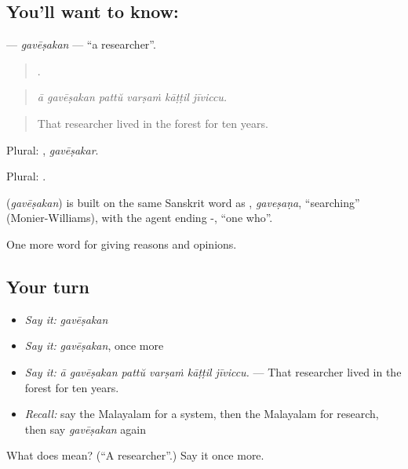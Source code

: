 \subsection*{You'll want to know: }
\textbf{} — \emph{gavēṣakan} — \textquotedblleft{}a researcher\textquotedblright{}.

\begin{quote}
     .
\end{quote}

\begin{quote}
\emph{ā gavēṣakan pattŭ varṣaṁ kāṭṭil jīviccu.}
\end{quote}

\begin{quote}
That researcher lived in the forest for ten years.
\end{quote}

Plural: , \emph{gavēṣakar}.

Plural: .

\begin{cousinweb}
\textbf{} (\emph{gavēṣakan}) is built on the same Sanskrit word as , \emph{gaveṣaṇa}, \textquotedblleft{}searching\textquotedblright{} (Monier-Williams), with the agent ending -, \textquotedblleft{}one who\textquotedblright{}.
\end{cousinweb}

\begin{grammarlens}[title={What you've built}]
One more word for giving reasons and opinions.
\end{grammarlens}

\subsection*{Your turn}
\begin{itemize}
\raggedright
  \item \emph{Say it:} \emph{gavēṣakan}
  \item \emph{Say it:} \emph{gavēṣakan}, once more
  \item \emph{Say it:} \emph{ā gavēṣakan pattŭ varṣaṁ kāṭṭil jīviccu.} — That researcher lived in the forest for ten years.
  \item \emph{Recall:} say the Malayalam for a system, then the Malayalam for research, then say \emph{gavēṣakan} again
\end{itemize}

\begin{tcolorbox}[breakable,colback=teal!4,colframe=teal!35!black,title={Before you move on}]
What does  mean? (\textquotedblleft{}A researcher\textquotedblright{}.) Say it once more.
\end{tcolorbox}
